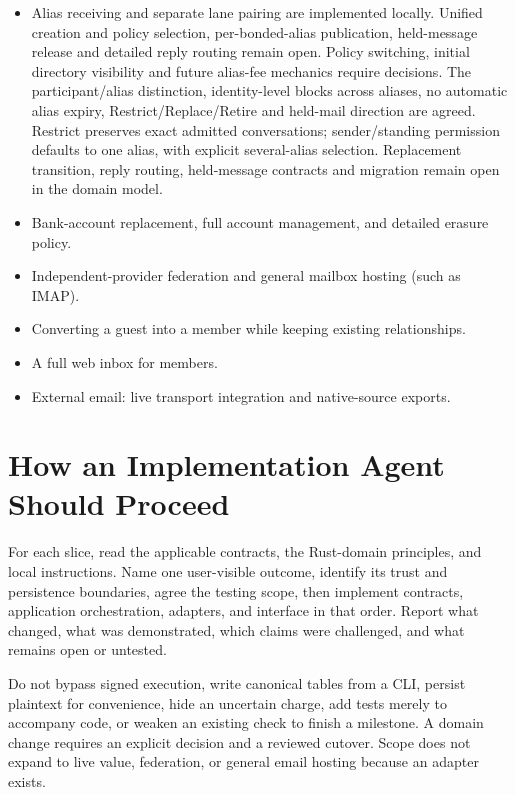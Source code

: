 \documentclass[11pt]{article}
\begin{document}
\begin{itemize}
    \item Alias receiving and separate lane pairing are implemented locally.
    Unified creation and policy selection, per-bonded-alias publication,
    held-message release and detailed reply routing remain open. Policy switching,
    initial directory visibility and future alias-fee mechanics require decisions. The participant/alias distinction, identity-level blocks across
    aliases, no automatic alias expiry, Restrict/Replace/Retire and
    held-mail direction are agreed. Restrict preserves exact admitted conversations;
    sender/standing permission defaults to one alias, with explicit several-alias
    selection. Replacement transition, reply routing,
    held-message contracts and migration remain open in the domain model.
    \item Bank-account replacement, full account management, and detailed
    erasure policy.
    \item Independent-provider federation and general mailbox hosting (such as IMAP).
    \item Converting a guest into a member while keeping existing relationships.
    \item A full web inbox for members.
    \item External email: live transport integration and native-source exports.
\end{itemize}

\section{How an Implementation Agent Should Proceed}

For each slice, read the applicable contracts, the Rust-domain principles, and
local instructions. Name one user-visible outcome, identify its trust and
persistence boundaries, agree the testing scope, then implement contracts,
application orchestration, adapters, and interface in that order. Report what
changed, what was demonstrated, which claims were challenged, and what remains
open or untested.

Do not bypass signed execution, write canonical tables from a CLI, persist
plaintext for convenience, hide an uncertain charge, add tests merely to
accompany code, or weaken an existing check to finish a milestone. A domain change
requires an explicit decision and a reviewed cutover. Scope does not expand to
live value, federation, or general email hosting because an adapter exists.
\end{document}
